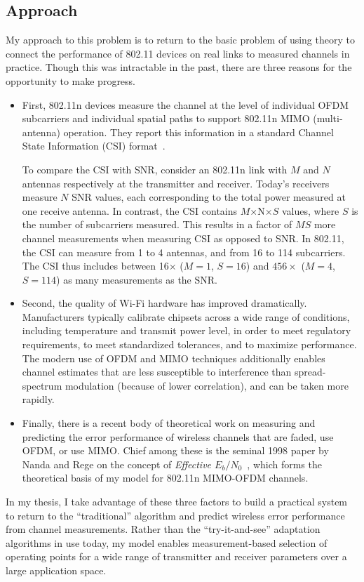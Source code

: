 \subsection{Approach}
My approach to this problem is to return to the basic problem of using theory to connect the performance of 802.11 devices on real links to measured channels in practice. Though this was intractable in the past, there are three reasons for the opportunity to make progress.
\begin{itemize}
\item First, 802.11n devices measure the channel at the level of individual OFDM subcarriers and individual spatial paths to support 802.11n MIMO (multi-antenna) operation. They report this information in a standard Channel State Information (CSI) format~\cite[\S7.3.1.27]{80211n}.

To compare the CSI with SNR, consider an 802.11n link with $M$ and $N$ antennas respectively at the transmitter and receiver. Today's receivers measure $N$ SNR values, each corresponding to the total power measured at one receive antenna. In contrast, the CSI contains $M$$\times$N$\times$$S$ values, where $S$ is the number of subcarriers measured. This results in a factor of $MS$ more channel measurements when measuring CSI as opposed to SNR\@. In 802.11, the CSI can measure from 1 to 4 antennas, and from 16 to 114 subcarriers. The CSI thus includes between 16$\times$ ($M=1$, $S=16$) and $456\times$ ($M=4$, $S=114$) as many measurements as the SNR\@.
\item Second, the quality of Wi-Fi hardware has improved dramatically. Manufacturers typically calibrate chipsets across a wide range of conditions, including temperature and transmit power level, in order to meet regulatory requirements, to meet standardized tolerances, and to maximize performance. The modern use of OFDM and MIMO techniques additionally enables channel estimates that are less susceptible to interference than spread-spectrum modulation (because of lower correlation), and can be taken more rapidly.
\item Finally, there is a recent body of theoretical work on measuring and predicting the error performance of wireless channels that are faded, use OFDM, or use MIMO\@. Chief among these is the seminal 1998 paper by Nanda and Rege on the concept of \emph{Effective $E_b/N_0$}~\cite{Nanda_effectiveSNR}, which forms the theoretical basis of my model for 802.11n MIMO-OFDM channels.
\end{itemize}
In my thesis, I take advantage of these three factors to build a practical system to return to the ``traditional'' algorithm and predict wireless error performance from channel measurements. Rather than the ``try-it-and-see'' adaptation algorithms in use today, my model enables measurement-based selection of operating points for a wide range of transmitter and receiver parameters over a large application space.

